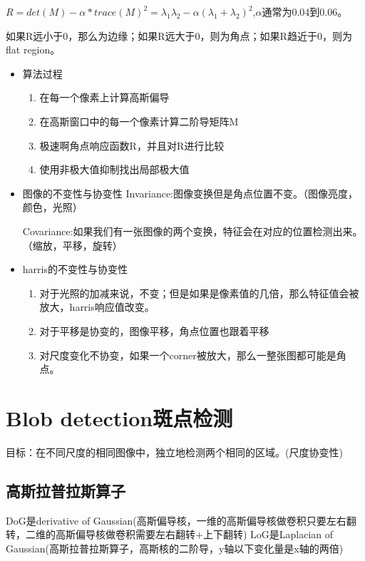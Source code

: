 \documentclass[UTF8]{ctexart}
\begin{document}
$R=det(M)-\alpha*trace(M)^2=\lambda_1\lambda_2-\alpha(\lambda_1+\lambda_2)^2$,$\alpha$通常为0.04到0.06。

如果R远小于0，那么为边缘；如果R远大于0，则为角点；如果R趋近于0，则为flat region。

\begin{itemize}
    \item 算法过程
    \begin{enumerate}
        \item 在每一个像素上计算高斯偏导
        \item 在高斯窗口中的每一个像素计算二阶导矩阵M
        \item 极速啊角点响应函数R，并且对R进行比较
        \item 使用非极大值抑制找出局部极大值
    \end{enumerate}
    
    \item 图像的不变性与协变性
    Invariance:图像变换但是角点位置不变。（图像亮度，颜色，光照）

    Covariance:如果我们有一张图像的两个变换，特征会在对应的位置检测出来。（缩放，平移，旋转）

    \item harris的不变性与协变性
    
    \begin{enumerate}
        \item 对于光照的加减来说，不变；但是如果是像素值的几倍，那么特征值会被放大，harris响应值改变。
        \item 对于平移是协变的，图像平移，角点位置也跟着平移
        \item 对尺度变化不协变，如果一个corner被放大，那么一整张图都可能是角点。
    \end{enumerate}
\end{itemize}

\section{Blob detection斑点检测}

目标：在不同尺度的相同图像中，独立地检测两个相同的区域。(尺度协变性)

\subsection{高斯拉普拉斯算子}
DoG是derivative of Gaussian(高斯偏导核，一维的高斯偏导核做卷积只要左右翻转，二维的高斯偏导核做卷积需要左右翻转+上下翻转)
LoG是Laplacian of Gaussian(高斯拉普拉斯算子，高斯核的二阶导，y轴以下变化量是x轴的两倍)
\end{document}
